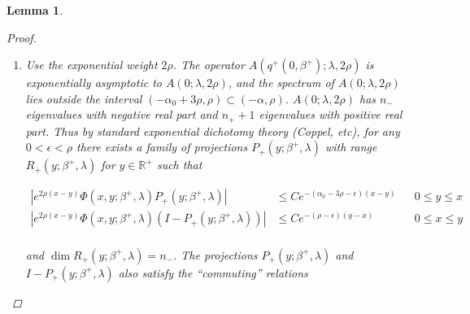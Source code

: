 \documentclass[12pt]{article}
\def\R{{\mathbb R}}
\newtheorem{lemma}{Lemma}
\begin{document}
\begin{lemma}
\begin{proof}
\begin{enumerate}
\begin{equation}\label{weightedeq}
V_\eta' = A(q^+(0, \beta^+); \lambda, \eta) V_\eta = (A(q^+(0, \beta^+); \lambda) + \eta I) V_\eta
\end{equation}

It is not hard to show that $V$ is a solution to \eqref{evpsimple} if and only if $V_\eta = e^{\eta x} V$ is a solution to \eqref{weightedeq}. From this, it follows that the evolution operator $\Phi(x, y; \beta^+, \lambda, \eta)$ of \eqref{weightedeq} is given by

\begin{equation}\label{evolweight}
\Phi(x, y; \beta^+, \lambda, \eta) = e^{\eta(x - y)} \Phi(x, y; \beta^+, \lambda)
\end{equation}

It is also not hard to show that $\nu$ is an eigenvalue of the asymptotic matrix $A(0; \lambda)$ if and only if $\nu + \eta$ is an eigenvalue of $A(0; \lambda, \eta)$. In other words, the exponential weight $\eta$ shifts all eigenvalues of the asymptotic matrix to the right by $\eta$. Since the exponential dichotomy is determined by the asymptotic matrix, this is all that matters.\\

\item Use the exponential weight $2 \rho$. The operator $A(q^+(0, \beta^+); \lambda, 2 \rho)$ is exponentially asymptotic to $A(0; \lambda, 2 \rho)$, and the spectrum of $A(0; \lambda, 2 \rho)$ lies outside the interval $(-\alpha_0 + 3 \rho, \rho) \subset (-\alpha, \rho)$. $A(0; \lambda, 2 \rho)$ has $n_-$ eigenvalues with negative real part and $n_+ + 1$ eigenvalues with positive real part. Thus by standard exponential dichotomy theory (Coppel, etc), for any $0 < \epsilon < \rho$ there exists a family of projections $P_+(y; \beta^+, \lambda)$ with range $R_+(y; \beta^+, \lambda)$ for $y \in \R^+$ such that

\begin{align*}
|e^{2 \rho (x - y)} \Phi(x, y; \beta^+, \lambda)P_+(y; \beta^+, \lambda)| &\leq C e^{-(\alpha_0 - 3 \rho - \epsilon)(x - y)} && 0 \leq y \leq x \\
|e^{2 \rho (x - y)} \Phi(x, y; \beta^+, \lambda)(I - P_+(y; \beta^+, \lambda))| &\leq C e^{-(\rho - \epsilon)(y - x)} && 0 \leq x \leq y \\
\end{align*}

and $\dim R_+(y; \beta^+, \lambda) = n_-$. The projections $P_+(y; \beta^+, \lambda)$ and $I - P_+(y; \beta^+, \lambda)$ also satisfy the ``commuting'' relations


\end{enumerate}
\end{proof}
\end{lemma}
\end{document}
